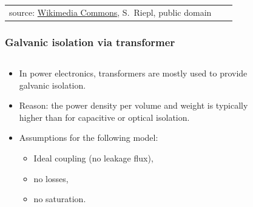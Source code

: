 \begin{frame}
\begin{table}
\begin{tabular}{M{0.3\textwidth} M{0.3\textwidth} M{0.3\textwidth}}
            {\small source: \href{https://commons.wikimedia.org/wiki/File:Trafo-innenleben.jpg}{Wikimedia Commons}, S.~Riepl, public domain}

		\end{tabular}
	\end{table}
\end{frame}

\begin{frame}
    \frametitle{Galvanic isolation via transformer}
    \begin{columns}
        \begin{column}{0.4\textwidth}
            \begin{itemize}
                \item In power electronics, transformers are mostly used to provide galvanic isolation.
                \item Reason: the power density per volume and weight is typically higher than for capacitive or optical isolation.
                \item Assumptions for the following model:
                \begin{itemize}
                    \item Ideal coupling \newline(no leakage flux),
                    \item no losses,
                    \item no saturation.
                \end{itemize}
            \end{itemize}
        \end{column}
        \begin{column}{0.6\textwidth}
            \begin{figure}
\end{figure}
\end{column}
\end{columns}
\end{frame}
